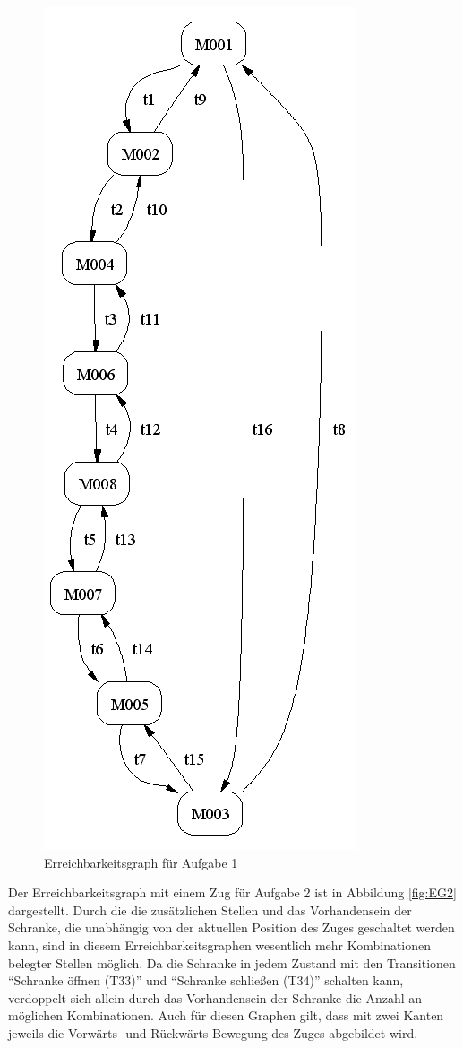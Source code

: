\documentclass[10pt]{scrartcl}
\begin{document}
\begin{figure}[htbp]
	\centering	\includegraphics[height=1.0\textheight]{Bilder/Aufgabe1_EG.png}
	\caption{Erreichbarkeitsgraph für Aufgabe 1}
	\label{fig:EG1}
\end{figure}

Der Erreichbarkeitsgraph mit einem Zug für Aufgabe 2 ist in Abbildung \ref{fig:EG2} dargestellt. Durch die die zusätzlichen Stellen und das Vorhandensein der Schranke, die unabhängig von der aktuellen Position des Zuges geschaltet werden kann, sind in diesem Erreichbarkeitsgraphen wesentlich mehr Kombinationen belegter Stellen möglich. Da die Schranke in jedem Zustand mit den Transitionen "`Schranke öffnen (T33)"' und "`Schranke schließen (T34)"' schalten kann, verdoppelt sich allein durch das Vorhandensein der Schranke die Anzahl an möglichen Kombinationen. Auch für diesen Graphen gilt, dass mit zwei Kanten jeweils die Vorwärts- und Rückwärts-Bewegung des Zuges abgebildet wird.
\end{document}
